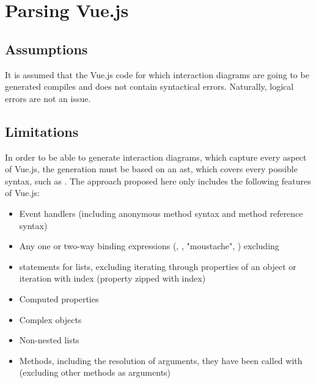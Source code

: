 \section{Parsing Vue.js}

\subsection{Assumptions}
It is assumed that the Vue.js code for which interaction diagrams are going to be generated compiles and does not contain syntactical errors. Naturally, logical errors are not an issue.
\subsection{Limitations}
\label{concept:parsing_limits}

In order to be able to generate interaction diagrams, which capture every aspect of Vue.js, the generation must be based on an \gls{ast}, which covers every possible syntax, such as \cite{eslint_vue_parser_ast}. The approach proposed here only includes the following features of Vue.js:
\begin{itemize}
    \item Event handlers (including anonymous method syntax and method reference syntax)
    \item Any one or two-way binding expressions (, , "moustache", ) excluding 
    \item {} statements for lists, excluding iterating through properties of an object or iteration with index (property zipped with index)
    \item Computed properties
    \item Complex objects
    \item Non-nested lists 
    \item Methods, including the resolution of arguments, they have been called with (excluding other methods as arguments)
\end{itemize}
\newpage
